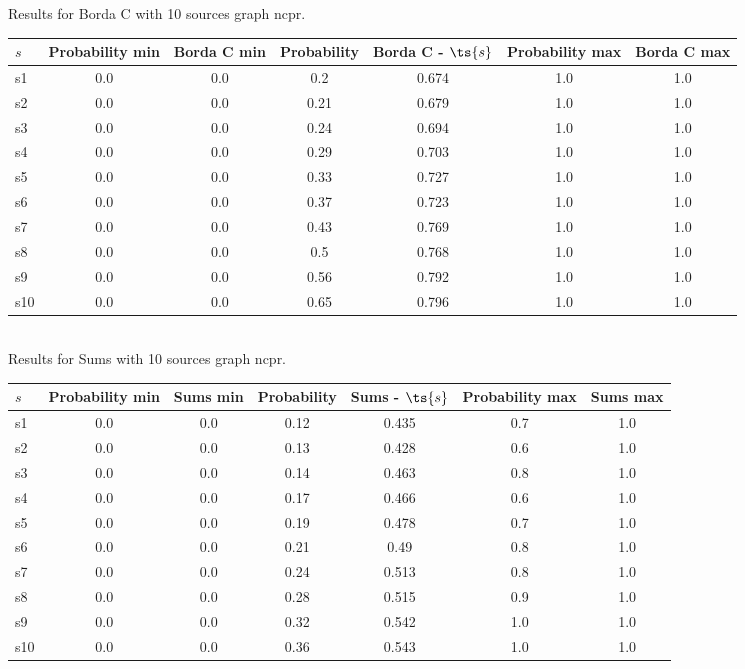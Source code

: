 \documentclass{article}
\begin{document}
\noindent Results for Borda C with 10 sources graph ncpr.

\noindent\begin{tabular}{|l|c|c|c|c|c|c|}
\hline
$s$& Probability min & Borda C min & Probability & Borda C - $\ts{s}$ & Probability max & Borda C max\\
\hline
s1 &0.0 & 0.0 & 0.2 & 0.674 & 1.0 & 1.0\\
\hline
s2 &0.0 & 0.0 & 0.21 & 0.679 & 1.0 & 1.0\\
\hline
s3 &0.0 & 0.0 & 0.24 & 0.694 & 1.0 & 1.0\\
\hline
s4 &0.0 & 0.0 & 0.29 & 0.703 & 1.0 & 1.0\\
\hline
s5 &0.0 & 0.0 & 0.33 & 0.727 & 1.0 & 1.0\\
\hline
s6 &0.0 & 0.0 & 0.37 & 0.723 & 1.0 & 1.0\\
\hline
s7 &0.0 & 0.0 & 0.43 & 0.769 & 1.0 & 1.0\\
\hline
s8 &0.0 & 0.0 & 0.5 & 0.768 & 1.0 & 1.0\\
\hline
s9 &0.0 & 0.0 & 0.56 & 0.792 & 1.0 & 1.0\\
\hline
s10 &0.0 & 0.0 & 0.65 & 0.796 & 1.0 & 1.0\\
\hline
\end{tabular}\\

\noindent Results for Sums with 10 sources graph ncpr.

\noindent\begin{tabular}{|l|c|c|c|c|c|c|}
\hline
$s$& Probability min & Sums min & Probability & Sums - $\ts{s}$ & Probability max & Sums max\\
\hline
s1 &0.0 & 0.0 & 0.12 & 0.435 & 0.7 & 1.0\\
\hline
s2 &0.0 & 0.0 & 0.13 & 0.428 & 0.6 & 1.0\\
\hline
s3 &0.0 & 0.0 & 0.14 & 0.463 & 0.8 & 1.0\\
\hline
s4 &0.0 & 0.0 & 0.17 & 0.466 & 0.6 & 1.0\\
\hline
s5 &0.0 & 0.0 & 0.19 & 0.478 & 0.7 & 1.0\\
\hline
s6 &0.0 & 0.0 & 0.21 & 0.49 & 0.8 & 1.0\\
\hline
s7 &0.0 & 0.0 & 0.24 & 0.513 & 0.8 & 1.0\\
\hline
s8 &0.0 & 0.0 & 0.28 & 0.515 & 0.9 & 1.0\\
\hline
s9 &0.0 & 0.0 & 0.32 & 0.542 & 1.0 & 1.0\\
\hline
s10 &0.0 & 0.0 & 0.36 & 0.543 & 1.0 & 1.0\\
\hline
\end{tabular}\\
\end{document}

